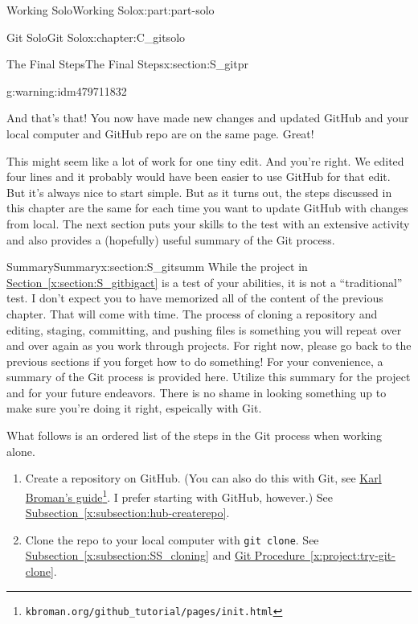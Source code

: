 \documentclass[oneside,10pt,]{book}
\newcommand{\xreffont}{\relax}
\newcommand{\mono}[1]{\texttt{#1}}
\begin{document}
\begin{partptx}{Working Solo}{}{Working Solo}{}{}{x:part:part-solo}
\begin{chapterptx}{Git Solo}{}{Git Solo}{}{}{x:chapter:C_gitsolo}
\begin{sectionptx}{The Final Steps}{}{The Final Steps}{}{}{x:section:S_gitpr}
\begin{warning}{}{g:warning:idm479711832}
\end{warning}
And that's that! You now have made new changes and updated GitHub and your local computer and GitHub repo are on the same page. Great!%
\par
This might seem like a lot of work for one tiny edit. And you're right. We edited four lines and it probably would have been easier to use GitHub for that edit. But it's always nice to start simple. But as it turns out, the steps discussed in this chapter are the same for each time you want to update GitHub with changes from local. The next section puts your skills to the test with an extensive activity and also provides a (hopefully) useful summary of the Git process.%
\end{sectionptx}
%
%
\typeout{************************************************}
\typeout{************************************************}
%
\begin{sectionptx}{Summary}{}{Summary}{}{}{x:section:S_gitsumm}
%
While the project in \hyperref[x:section:S_gitbigact]{Section~{\xreffont\ref{x:section:S_gitbigact}}} is a test of your abilities, it is not a ``traditional'' test. I don't expect you to have memorized all of the content of the previous chapter. That will come with time. The process of cloning a repository and editing, staging, committing, and pushing files is something you will repeat over and over again as you work through projects. For right now, please go back to the previous sections if you forget how to do something! For your convenience, a summary of the Git process is provided here. Utilize this summary for the project and for your future endeavors. There is no shame in looking something up to make sure you're doing it right, espeically with Git.%
\par
What follows is an ordered list of the steps in the Git process when working alone.%
\begin{enumerate}
\item{}Create a repository on GitHub. (You can also do this with Git, see \href{https://kbroman.org/github_tutorial/pages/init.html}{Karl Broman's guide}\footnote{\nolinkurl{kbroman.org/github_tutorial/pages/init.html}\label{g:fn:idm479705944}}. I prefer starting with GitHub, however.) See \hyperref[x:subsection:hub-createrepo]{Subsection~{\xreffont\ref{x:subsection:hub-createrepo}}}.%
\item{}Clone the repo to your local computer with \mono{git clone}. See \hyperref[x:subsection:SS_cloning]{Subsection~{\xreffont\ref{x:subsection:SS_cloning}}} and \hyperref[x:project:try-git-clone]{Git Procedure~{\xreffont\ref{x:project:try-git-clone}}}.%

\end{enumerate}
\end{sectionptx}
\end{chapterptx}
\end{partptx}
\end{document}
